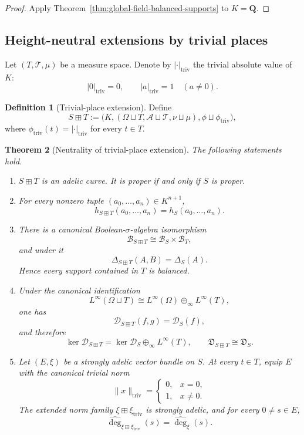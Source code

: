 \documentclass[11pt]{amsart}
\numberwithin{equation}{section}
\newtheorem{theorem}{Theorem}[section]
\theoremstyle{definition}
\newtheorem{definition}[theorem]{Definition}
\newcommand{\Q}{\mathbf Q}
\begin{document}
\begin{proof}
Apply Theorem~\ref{thm:global-field-balanced-supports} to $K=\Q$.
\end{proof}

\subsection{Height-neutral extensions by trivial places}

Let $(T,\mathcal T,\mu)$ be a measure space.  Denote by
$|\cdot|_{\mathrm{triv}}$ the trivial absolute value of $K$:
\[
|0|_{\mathrm{triv}}=0,
\qquad
|a|_{\mathrm{triv}}=1\quad(a\neq0).
\]

\begin{definition}[Trivial-place extension]
\label{def:trivial-place-extension}
Define
\[
S\boxplus T
:=
\bigl(K,(\Omega\sqcup T,\mathcal A\sqcup\mathcal T,
\nu\sqcup\mu),\phi\sqcup\phi_{\mathrm{triv}}\bigr),
\]
where $\phi_{\mathrm{triv}}(t)=|\cdot|_{\mathrm{triv}}$ for every
$t\in T$.
\end{definition}

\begin{theorem}[Neutrality of trivial-place extension]
\label{thm:trivial-place-neutrality}
The following statements hold.
\begin{enumerate}[label=\textup{(\arabic*)}]
\item $S\boxplus T$ is an adelic curve.  It is proper if and only if $S$ is
proper.
\item For every nonzero tuple $(a_0,\dots,a_n)\in K^{n+1}$,
\[
h_{S\boxplus T}(a_0,\dots,a_n)
=h_S(a_0,\dots,a_n).
\]
\item There is a canonical Boolean-$\sigma$-algebra isomorphism
\[
\mathscr B_{S\boxplus T}
\cong
\mathscr B_S\times\mathscr B_T,
\]
and under it
\[
\Delta_{S\boxplus T}(A,B)=\Delta_S(A).
\]
Hence every support contained in $T$ is balanced.
\item Under the canonical identification
\[
L^\infty(\Omega\sqcup T)\cong
L^\infty(\Omega)\oplus_\infty L^\infty(T),
\]
one has
\[
\mathscr D_{S\boxplus T}(f,g)=\mathscr D_S(f),
\]
and therefore
\[
\ker\mathscr D_{S\boxplus T}
=\ker\mathscr D_S\oplus_\infty L^\infty(T),
\qquad
\mathfrak D_{S\boxplus T}\cong\mathfrak D_S.
\]
\item Let $(E,\xi)$ be a strongly adelic vector bundle on $S$.  At every
$t\in T$, equip $E$ with the canonical trivial norm
\[
\|x\|_{\mathrm{triv}}
=
\begin{cases}
0,&x=0,\\
1,&x\neq0.
\end{cases}
\]
The extended norm family $\xi\boxplus\xi_{\mathrm{triv}}$ is strongly
adelic, and for every $0\neq s\in E$,
\[
\widehat{\deg}_{\xi\boxplus\xi_{\mathrm{triv}}}(s)
=
\widehat{\deg}_{\xi}(s).
\]
\end{enumerate}
\end{theorem}
\end{document}
